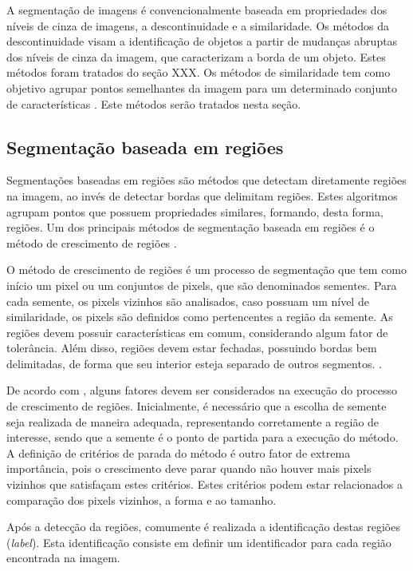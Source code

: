 \documentclass[
	12pt,				%
	oneside,			%
	a4paper,			%
	english,			%
	french,				%
	spanish,			%
	brazil,				%
	]{abntex2}
\begin{document}
A segmentação de imagens é convencionalmente baseada em propriedades dos níveis de cinza de imagens, a descontinuidade e a similaridade. Os métodos da descontinuidade visam a identificação de objetos a partir de mudanças abruptas dos níveis de cinza da imagem, que caracterizam a borda de um objeto. Estes métodos foram tratados do seção XXX. Os métodos de similaridade tem como objetivo agrupar pontos semelhantes da imagem para um determinado conjunto de características \cite{pedriniSchwartz:2008}. Este métodos serão tratados nesta seção.
    
\subsection{Segmentação baseada em regiões}     

Segmentações baseadas em regiões são métodos que detectam diretamente regiões na imagem, ao invés de detectar bordas que delimitam regiões. Estes algoritmos agrupam pontos que possuem propriedades similares, formando, desta forma, regiões. Um dos principais métodos de segmentação baseada em regiões é o método de crescimento de regiões \cite{pedriniSchwartz:2008}.

O método de crescimento de regiões é um processo de segmentação que tem como início um pixel ou um conjuntos de pixels, que são denominados sementes. Para cada semente, os pixels vizinhos são analisados, caso possuam um nível de similaridade, os pixels são definidos como pertencentes a região da semente. As regiões devem possuir características em comum, considerando algum fator de tolerância. Além disso, regiões devem estar fechadas, possuindo bordas bem delimitadas, de forma que seu interior esteja separado de outros segmentos. \cite{conciAzevedoLeta:2008}.

De acordo com \citet{conciAzevedoLeta:2008}, alguns fatores devem ser considerados na execução do processo de crescimento de regiões. Inicialmente, é necessário que a escolha de semente seja realizada de maneira adequada, representando corretamente a região de interesse, sendo que a semente é o ponto de partida para a execução do método. A definição de critérios de parada do método é outro fator de extrema importância, pois o crescimento deve parar quando não houver mais pixels vizinhos que satisfaçam estes critérios. Estes critérios podem estar relacionados a comparação dos pixels vizinhos, a forma e ao tamanho.

Após a detecção da regiões, comumente é realizada a identificação destas regiões (\textit{label}). Esta identificação consiste em definir um identificador para cada região encontrada na imagem. 
\end{document}
